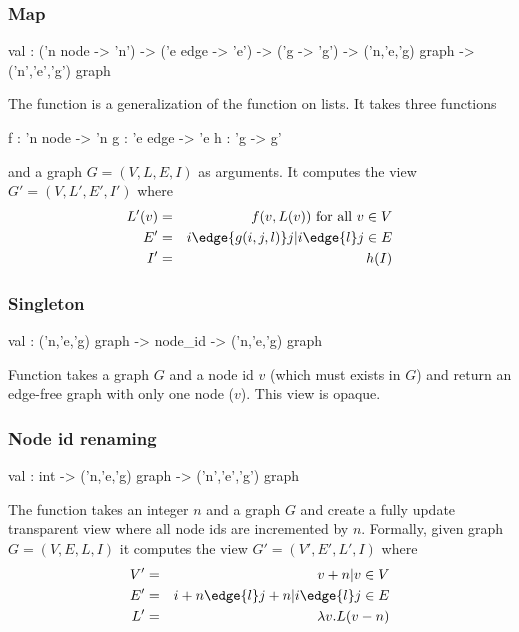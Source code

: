 \subsubsection{Map}
\begin{SML}
   val  :
     ('n node -> 'n') -> ('e edge -> 'e') -> ('g -> 'g') -> 
     ('n,'e,'g) graph -> ('n','e','g') graph
\end{SML}
The function  is a generalization of the 
function on lists.  It takes three functions 
\begin{SML}
f : 'n node -> 'n
g : 'e edge -> 'e
h : 'g -> g'
\end{SML}
and a graph $G=(V,L,E,I)$ as arguments.  
It computes the view $G'=(V,L',E',I')$ where
\begin{eqnarray*}
  L'(v) & = & f(v,L(v)) \mbox{\ for all $v \in V$} \\
  E'    & = & { i \edge{g(i,j,l)} j | i \edge{l} j \in E } \\
  I'    & = & h(I) 
\end{eqnarray*}

\subsubsection{Singleton}
\begin{SML}
   val  : ('n,'e,'g) graph -> node_id -> ('n,'e,'g) graph
\end{SML}
Function  
takes a graph $G$ and a node id $v$ (which must exists in $G$)
and return an edge-free graph with only one node ($v$).
This view is opaque.

\subsubsection{Node id renaming}
\begin{SML}
   val  : int -> ('n,'e,'g) graph -> ('n','e','g') graph
\end{SML}
The function  takes an integer $n$ and
a graph $G$ and create a fully update transparent
view where all node ids are incremented by $n$.  Formally,
given graph $G=(V,E,L,I)$ it computes the view $G'=(V',E',L',I)$
where
\begin{eqnarray*}
   V' & = & { v + n | v \in V } \\
   E' & = & { i+n \edge{l} j+n | i \edge{l} j \in E } \\
   L' & = & \lambda v. L(v-n) 
\end{eqnarray*}

